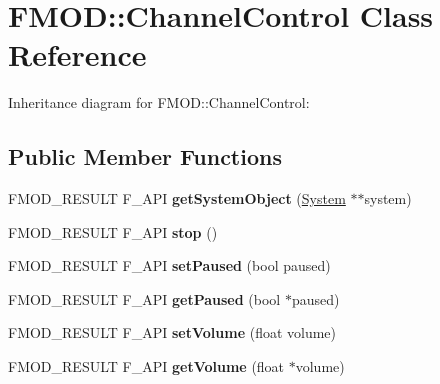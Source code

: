 \hypertarget{class_f_m_o_d_1_1_channel_control}{\section{F\+M\+O\+D\+:\+:Channel\+Control Class Reference}
\label{class_f_m_o_d_1_1_channel_control}
}


Inheritance diagram for F\+M\+O\+D\+:\+:Channel\+Control\+:
\subsection*{Public Member Functions}
\begin{DoxyCompactItemize}
\item 
\hypertarget{class_f_m_o_d_1_1_channel_control_a8364d9a55bf85d03de5813f17a074e5a}{F\+M\+O\+D\+\_\+\+R\+E\+S\+U\+L\+T F\+\_\+\+A\+P\+I {\bfseries get\+System\+Object} (\hyperlink{class_f_m_o_d_1_1_system}{System} $\ast$$\ast$system)}\label{class_f_m_o_d_1_1_channel_control_a8364d9a55bf85d03de5813f17a074e5a}

\item 
\hypertarget{class_f_m_o_d_1_1_channel_control_a5eb6a02a08058a217a9149b5f9051b51}{F\+M\+O\+D\+\_\+\+R\+E\+S\+U\+L\+T F\+\_\+\+A\+P\+I {\bfseries stop} ()}\label{class_f_m_o_d_1_1_channel_control_a5eb6a02a08058a217a9149b5f9051b51}

\item 
\hypertarget{class_f_m_o_d_1_1_channel_control_a648b799ac7258df17d2a9aa362561aa2}{F\+M\+O\+D\+\_\+\+R\+E\+S\+U\+L\+T F\+\_\+\+A\+P\+I {\bfseries set\+Paused} (bool paused)}\label{class_f_m_o_d_1_1_channel_control_a648b799ac7258df17d2a9aa362561aa2}

\item 
\hypertarget{class_f_m_o_d_1_1_channel_control_a8e1963bd761bf482e10a6a9835bcfdd2}{F\+M\+O\+D\+\_\+\+R\+E\+S\+U\+L\+T F\+\_\+\+A\+P\+I {\bfseries get\+Paused} (bool $\ast$paused)}\label{class_f_m_o_d_1_1_channel_control_a8e1963bd761bf482e10a6a9835bcfdd2}

\item 
\hypertarget{class_f_m_o_d_1_1_channel_control_a614531fff4b8be9646c9d34c13a6317a}{F\+M\+O\+D\+\_\+\+R\+E\+S\+U\+L\+T F\+\_\+\+A\+P\+I {\bfseries set\+Volume} (float volume)}\label{class_f_m_o_d_1_1_channel_control_a614531fff4b8be9646c9d34c13a6317a}

\item 
\hypertarget{class_f_m_o_d_1_1_channel_control_a5e3d159d6bef6714d585f52b2b98de2e}{F\+M\+O\+D\+\_\+\+R\+E\+S\+U\+L\+T F\+\_\+\+A\+P\+I {\bfseries get\+Volume} (float $\ast$volume)}\label{class_f_m_o_d_1_1_channel_control_a5e3d159d6bef6714d585f52b2b98de2e}


\end{DoxyCompactItemize}
